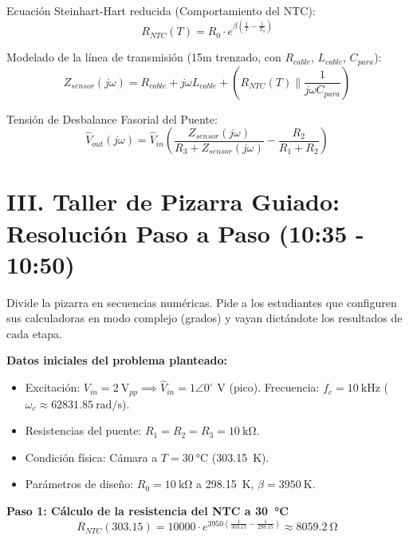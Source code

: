 \documentclass[11pt,a4paper]{article}
\begin{document}
Ecuación Steinhart-Hart reducida (Comportamiento del NTC):
\begin{equation}
    R_{NTC}(T) = R_0 \cdot e^{\beta \left( \frac{1}{T} - \frac{1}{T_0} \right)}
\end{equation}

Modelado de la línea de transmisión (15m trenzado, con $R_{cable}$, $L_{cable}$, $C_{para}$):
\begin{equation}
    Z_{sensor}(j\omega) = R_{cable} + j\omega L_{cable} + \left( R_{NTC}(T) \parallel \frac{1}{j\omega C_{para}} \right)
\end{equation}

Tensión de Desbalance Fasorial del Puente:
\begin{equation}
    \hat{V}_{out}(j\omega) = \hat{V}_{in} \left( \frac{Z_{sensor}(j\omega)}{R_3 + Z_{sensor}(j\omega)} - \frac{R_2}{R_1 + R_2} \right)
\end{equation}

\newpage
\section*{III. Taller de Pizarra Guiado: Resolución Paso a Paso (10:35 - 10:50)}

\begin{acciondocente}
Divide la pizarra en secuencias numéricas. Pide a los estudiantes que configuren sus calculadoras en modo complejo (grados) y vayan dictándote los resultados de cada etapa.
\end{acciondocente}

\noindent \textbf{Datos iniciales del problema planteado:}
\begin{itemize}[label=$\circ$, itemsep=1pt]
    \item Excitación: $V_{in} = \qty{2}{\volt}_{pp} \implies \hat{V}_{in} = 1 \angle 0^\circ \text{ V}$ (pico). Frecuencia: $f_c = \qty{10}{\kilo\hertz}$ ($\omega_c \approx \qty{62831.85}{\radian\per\second}$).
    \item Resistencias del puente: $R_1 = R_2 = R_3 = \qty{10}{\kilo\ohm}$.
    \item Condición física: Cámara a $T = \qty{30}{\celsius}$ (\qty{303.15}{\kelvin}).
    \item Parámetros de diseño: $R_0 = \qty{10}{\kilo\ohm}$ a \qty{298.15}{\kelvin}, $\beta = \qty{3950}{\kelvin}$.
\end{itemize}

\vspace{0.3cm}
\noindent \textbf{Paso 1: Cálculo de la resistencia del NTC a \qty{30}{\celsius}}
\begin{equation*}
    R_{NTC}(303.15) = 10000 \cdot e^{3950 \left( \frac{1}{303.15} - \frac{1}{298.15} \right)} \approx \qty{8059.2}{\ohm}
\end{equation*}
\end{document}
